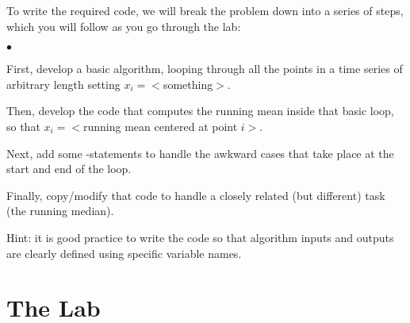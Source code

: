 \documentclass[letterpaper,11pt]{article}
\newcounter{lnum}
\newenvironment{abbrevlist}%
  {\begin{list}{$\bullet$}{\setlength{\leftmargin}{2em}%
               \setlength{\itemindent}{0em}%
               \setlength{\itemsep}{0pt}%
               \setlength{\parsep}{0pt}%
               \setlength{\topsep}{2pt}%
               \usecounter{lnum} } }{\end{list}}
\begin{document}
To write the required code, we will break the problem down into a series of steps, which you will follow
as you go through the lab:
\begin{abbrevlist}
\item First, develop a basic   algorithm, looping through all the points in a time
series of arbitrary length setting $x_i = <$something$>$.
\item Then, develop the code that computes the running mean inside that basic loop, so that
$x_i = <$running mean centered at point $i>$.
\item Next, add some -statements to handle the awkward cases that take place at the start and end 
of the loop.
\item  Finally, copy/modify that code to handle a closely related (but different) task (the running median).
\end{abbrevlist}
Hint: it is good practice to write the code so that algorithm inputs and outputs are clearly 
defined using specific variable names. 

\section*{The Lab}
\end{document}
